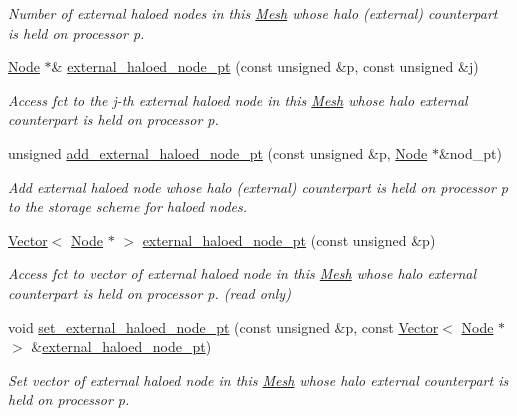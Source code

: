 \begin{DoxyCompactItemize}
\begin{DoxyCompactList}\small\item\em Number of external haloed nodes in this \hyperlink{classoomph_1_1Mesh}{Mesh} whose halo (external) counterpart is held on processor p. \end{DoxyCompactList}\item 
\hyperlink{classoomph_1_1Node}{Node} $\ast$\& \hyperlink{classoomph_1_1Mesh_a438252c1785f8beea0c0ad4cbeb33e37}{external\+\_\+haloed\+\_\+node\+\_\+pt} (const unsigned \&p, const unsigned \&j)
\begin{DoxyCompactList}\small\item\em Access fct to the j-\/th external haloed node in this \hyperlink{classoomph_1_1Mesh}{Mesh} whose halo external counterpart is held on processor p. \end{DoxyCompactList}\item 
unsigned \hyperlink{classoomph_1_1Mesh_a2cc2600eb480287be5afe6bebf430c00}{add\+\_\+external\+\_\+haloed\+\_\+node\+\_\+pt} (const unsigned \&p, \hyperlink{classoomph_1_1Node}{Node} $\ast$\&nod\+\_\+pt)
\begin{DoxyCompactList}\small\item\em Add external haloed node whose halo (external) counterpart is held on processor p to the storage scheme for haloed nodes. \end{DoxyCompactList}\item 
\hyperlink{classoomph_1_1Vector}{Vector}$<$ \hyperlink{classoomph_1_1Node}{Node} $\ast$ $>$ \hyperlink{classoomph_1_1Mesh_ae3675ceb40e2b8e8eaaab4a2c2bddd65}{external\+\_\+haloed\+\_\+node\+\_\+pt} (const unsigned \&p)
\begin{DoxyCompactList}\small\item\em Access fct to vector of external haloed node in this \hyperlink{classoomph_1_1Mesh}{Mesh} whose halo external counterpart is held on processor p. (read only) \end{DoxyCompactList}\item 
void \hyperlink{classoomph_1_1Mesh_a3220b47346e18322fbb2517a1879cd7b}{set\+\_\+external\+\_\+haloed\+\_\+node\+\_\+pt} (const unsigned \&p, const \hyperlink{classoomph_1_1Vector}{Vector}$<$ \hyperlink{classoomph_1_1Node}{Node} $\ast$$>$ \&\hyperlink{classoomph_1_1Mesh_a438252c1785f8beea0c0ad4cbeb33e37}{external\+\_\+haloed\+\_\+node\+\_\+pt})
\begin{DoxyCompactList}\small\item\em Set vector of external haloed node in this \hyperlink{classoomph_1_1Mesh}{Mesh} whose halo external counterpart is held on processor p. \end{DoxyCompactList}\item 
$$
\end{DoxyCompactItemize}
